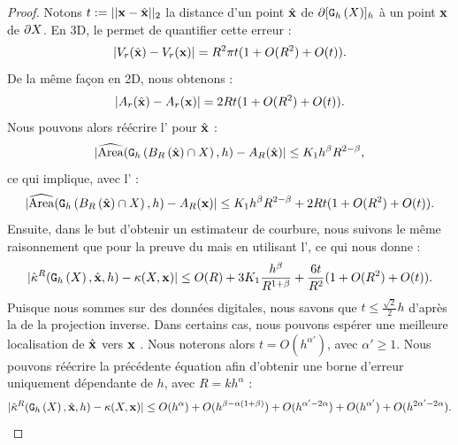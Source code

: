 \begin{proof}
%
Notons $t \EqDef ||\vx-\vxH||_2$ la distance d'un point $\vxH$ de
$\Bd{\Body{\DSh}{h}}$ à un point $\vx$ de $\dS$. En 3D, le
 permet de quantifier cette erreur :
%
\begin{equation}\label{eq:volume-shift-error}
  | V_r(\vxH) - V_r(\vx) | = R^2 \pi t (1 + O(R^2)+O(t)).
\end{equation}
%
De la même façon en 2D, nous obtenons :
%
\begin{equation}\label{eq:area-shift-error}
  | A_r(\vxH) - A_r(\vx) | = 2R t (1 + O(R^2)+O(t)).
\end{equation}
%
Nous pouvons alors réécrire l'
pour $\vxH$ :
%
\begin{equation}
  | \AreaC(\DigF{\Ball{R}{\vxH} \cap \Shape}{h}, h) - A_R(\vxH) | \le K_1 h^\beta R^{2-\beta},
\end{equation}
%
ce qui implique, avec l' :
%
\begin{equation}\label{eq:shift-B-R-error-bound-2D}
  | \AreaC(\DigF{\Ball{R}{\vxH} \cap \Shape}{h}, h) - A_R(\vx) |  \le K_1 h^\beta R^{2-\beta} +  2 R t (1 + O(R^2) + O(t)).
\end{equation}
%
Ensuite, dans le but d'obtenir un estimateur de courbure, nous suivons le même
raisonnement que pour la preuve du  mais en
utilisant l', ce qui nous donne :
%
\begin{equation}\label{eq:shift-curvhat-error-bound-2D}
  | \CurvH{R}(\DSh,\vxH,h) - \Curv(\Shape,\vx) | \le O(R) + 3 K_1 \frac{h^\beta}{R^{1+\beta}} + \frac{6 t}{R^2}(1 + O(R^2) + O(t)).
\end{equation}
%
Puisque nous sommes sur des données digitales, nous savons que $t \le
\frac{\sqrt{2}}{2}h$ d'après la  de la projection
inverse. Dans certains cas, nous pouvons espérer une meilleure localisation de
$\vxH$ vers $\vx$ \cite{deVieilleville2006}. Nous noterons alors $t =
O(h^{\alpha'})$, avec $\alpha' \ge 1$. Nous pouvons réécrire la précédente
équation afin d'obtenir une borne d'erreur uniquement dépendante de $h$, avec
$R=kh^{\alpha}$ :
%
\begin{equation} \label{eq:shift-curvhat-error-bound-h-only}
  | \CurvH{R}(\DSh,\vxH,h) - \Curv(\Shape,\vx) |
  \le O(h^\alpha) + O(h^{\beta-\alpha(1+\beta)}) + O(h^{\alpha'-2\alpha})
    + O(h^{\alpha'}) + O(h^{2\alpha'-2\alpha}).
\end{equation}

\end{proof}
